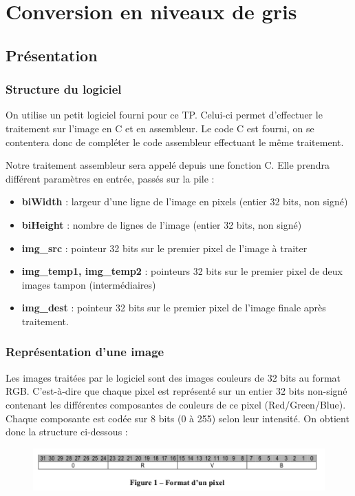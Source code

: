 \chapter{Conversion en niveaux de gris}
\section{Présentation}
\subsection{Structure du logiciel}
On utilise un petit logiciel fourni pour ce TP. Celui-ci permet d'effectuer le traitement sur l'image en C et en assembleur. Le code C est fourni, on se contentera donc de compléter le code assembleur effectuant le même traitement.

\medskip

Notre traitement assembleur sera appelé depuis une fonction C. Elle prendra différent paramètres en entrée, passés sur la pile :

\begin{itemize}
\item \textbf{biWidth} : largeur d’une ligne de l’image en pixels (entier 32 bits, non signé)
\item \textbf{biHeight} : nombre de lignes de l’image (entier 32 bits, non signé)
\item \textbf{img\_src} : pointeur 32 bits sur le premier pixel de l’image à traiter
\item \textbf{img\_temp1, img\_temp2} : pointeurs 32 bits sur le premier pixel de deux images tampon (intermédiaires)
\item \textbf{img\_dest} : pointeur 32 bits sur le premier pixel de l’image finale après traitement.
\end{itemize}

\subsection{Représentation d'une image}
Les images traitées par le logiciel sont des images couleurs de 32 bits au format RGB. C'est-à-dire que chaque pixel est représenté sur un entier 32 bits non-signé contenant les différentes composantes de couleurs de ce pixel (Red/Green/Blue). Chaque composante est codée sur 8 bits (0 à 255) selon leur intensité. On obtient donc la structure ci-dessous :
\begin{figure}[!h]
   \centering\includegraphics[width=\textwidth]{img/pixel.png}
\end{figure}

